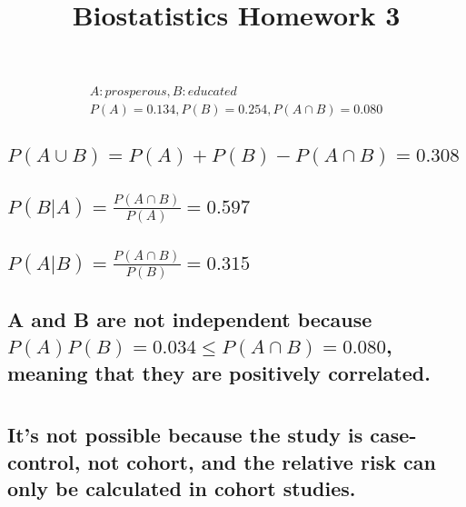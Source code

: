 \documentclass{homework}
\begin{document}
\title{Biostatistics Homework 3}
\author{\chineseName \masterStudentID}
\date{}
\maketitle

\section{}

\begin{gather*}
A: prosperous, B: educated \\
P(A)=0.134, P(B)=0.254, P(A\cap B)=0.080
\end{gather*}

\subsection{\(P(A \cup B) = P(A) + P(B) - P(A \cap B) = 0.308\)}

\subsection{\(P(B|A) = \frac{P(A \cap B)}{P(A)} = 0.597\)}

\subsection{\(P(A|B) = \frac{P(A \cap B)}{P(B)} = 0.315\)}

\subsection{A and B are not independent because \(P(A)P(B) = 0.034 \leq P(A \cap B) = 0.080\), meaning that they are positively correlated.}

\section{}

\subsection{It's not possible because the study is case-control, not cohort, and the relative risk can only be calculated in cohort studies.}

\subsection{}
\end{document}

